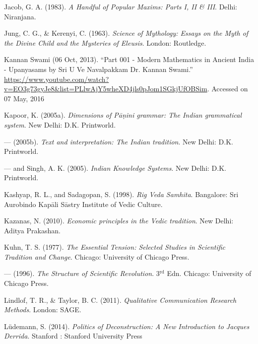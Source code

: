 \begin{thebibliography}{99}


Jacob, G. A. (1983). {\sl A Handful of Popular Maxims: Parts I, II \& III}. Delhi: Niranjana.

Jung, C. G., \& Kerenyi, C. (1963). {\sl Science of Mythology: Essays on the Myth of the Divine Child and the Mysteries of Eleusis}. London: Routledge. 

Kannan Swami (06 Oct, 2013). ``Part 001 - Modern Mathematics in Ancient India - Upanyasams by Sri U Ve Navalpakkam Dr. Kannan Swami.'' \url{https://www.youtube.com/watch?v=EO3g73gyJe8&list=PLlwAjY5wheXD4jls0pJom1SGkjUfOBSim}. Accessed on 07 May, 2016

Kapoor, K. (2005a). {\sl Dimensions of Pāṇini grammar: The Indian grammatical system}. New Delhi: D.K. Printworld.

--- (2005b). {\sl Text and interpretation: The Indian tradition}. New Delhi: D.K. Printworld. 

--- and Singh, A. K. (2005). {\sl Indian Knowledge Systems}. New Delhi: D.K. Printworld.

Kashyap, R. L., and Sadagopan, S. (1998). {\sl Rig Veda Samhita}. Bangalore: Sri Aurobindo Kapāli Sāstry Institute of Vedic Culture.

Kazanas, N. (2010). {\sl Economic principles in the Vedic tradition}. New Delhi: Aditya Prakashan.

Kuhn, T. S. (1977). {\sl The Essential Tension: Selected Studies in Scientific Tradition and Change}. Chicago: University of Chicago Press.

--- (1996). {\sl The Structure of Scientific Revolution}. 3$^{\text{rd}}$ Edn. Chicago: University of Chicago Press.

Lindlof, T. R., \& Taylor, B. C. (2011). {\sl Qualitative Communication Research Methods}. London: SAGE.

Lüdemann, S. (2014). {\sl Politics of Deconstruction: A New Introduction to Jacques Derrida}. Stanford : Stanford University Press


\end{thebibliography}
